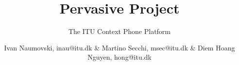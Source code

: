 \documentclass{scrartcl}
\begin{document}
\title{Pervasive Project}
\subtitle{The ITU Context Phone Platform}
\author{Ivan Naumovski, inau@itu.dk \& Martino Secchi, msec@itu.dk \& Diem Hoang Nguyen, hong@itu.dk}

\maketitle
\tableofcontents


\end{document}
